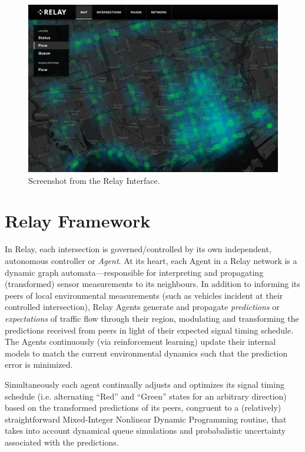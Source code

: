 \documentclass[a4paper,10pt]{article}
\begin{document}
\begin{multicols}{2}
\begin{figure}[H]
  \begin{centering}
    \includegraphics[scale=0.4]{figures/flow-2.png}
    \caption{Screenshot from the Relay Interface.}
    \label{fig:interface}
  \end{centering}
\end{figure}

\section{Relay Framework}

In Relay, each intersection is governed/controlled by its own independent, autonomous controller or \emph{Agent}.
At its heart, each Agent in a Relay network is a dynamic graph automata---responsible for interpreting and propagating (transformed) sensor measurements to its neighbours.
In addition to informing its peers of local environmental measurements (such as vehicles incident at their controlled intersection), Relay Agents generate and propagate \emph{predictions} or \emph{expectations} of traffic flow through their region, modulating and transforming the predictions received from peers in light of their expected signal timing schedule.
The Agents continuously (via reinforcement learning) update their internal models to match the current environmental dynamics such that the prediction error is minimized.

Simultaneously each agent continually adjusts and optimizes its signal timing schedule (i.e. alternating ``Red'' and ``Green'' states for an arbitrary direction) based on the transformed predictions of its peers, congruent to a (relatively) straightforward Mixed-Integer Nonlinear Dynamic Programming routine, that takes into account dynamical queue simulations and probabalistic uncertainty associated with the predictions.


\end{multicols}
\end{document}

